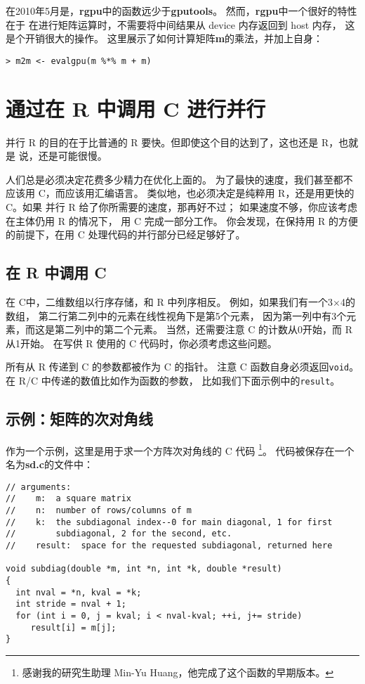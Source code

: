 在2010年5月是，{\bf rgpu}中的函数远少于{\bf gputools}。
然而，{\bf rgpu}中一个很好的特性在于
在进行矩阵运算时，不需要将中间结果从 device 内存返回到 host 内存，
这是个开销很大的操作。
这里展示了如何计算矩阵{\bf m}的乘法，并加上自身：

\begin{lstlisting}
> m2m <- evalgpu(m %*% m + m)
\end{lstlisting}

\section{通过在 R 中调用 C 进行并行}
\label{cfromr}

并行 R 的目的在于比普通的 R 要快。但即使这个目的达到了，这也还是 R，也就是
说，还是可能很慢。

人们总是必须决定花费多少精力在优化上面的。
为了最快的速度，我们甚至都不应该用 C，而应该用汇编语言。
类似地，也必须决定是纯粹用 R，还是用更快的 C。如果
并行 R 给了你所需要的速度，那再好不过；
如果速度不够，你应该考虑在主体仍用 R 的情况下，
用 C 完成一部分工作。
你会发现，在保持用 R 的方便的前提下，在用 C 处理代码的并行部分已经足够好了。


\subsection{在 R 中调用 C}

在 C中，二维数组以行序存储，和 R 中列序相反。
例如，如果我们有一个3$\times$4的数组，
第二行第二列中的元素在线性视角下是第5个元素，
因为第一列中有3个元素，而这是第二列中的第二个元素。
当然，还需要注意 C 的计数从0开始，而 R 从1开始。
在写供 R 使用的 C 代码时，你必须考虑这些问题。

所有从 R 传递到 C 的参数都被作为 C 的指针。
注意 C 函数自身必须返回{\tt void}。
在 R/C 中传递的数值比如作为函数的参数，
比如我们下面示例中的{\tt result}。

\subsection{示例：矩阵的次对角线}

作为一个示例，这里是用于求一个方阵次对角线的 C 代码
\footnote{感谢我的研究生助理 Min-Yu Huang，他完成了这个函数的早期版本。}。
代码被保存在一个名为{\bf sd.c}的文件中：

\begin{lstlisting}
// arguments:
//    m:  a square matrix
//    n:  number of rows/columns of m
//    k:  the subdiagonal index--0 for main diagonal, 1 for first
//        subdiagonal, 2 for the second, etc.
//    result:  space for the requested subdiagonal, returned here

void subdiag(double *m, int *n, int *k, double *result)
{
  int nval = *n, kval = *k;
  int stride = nval + 1;
  for (int i = 0, j = kval; i < nval-kval; ++i, j+= stride)
     result[i] = m[j];
}
\end{lstlisting}


